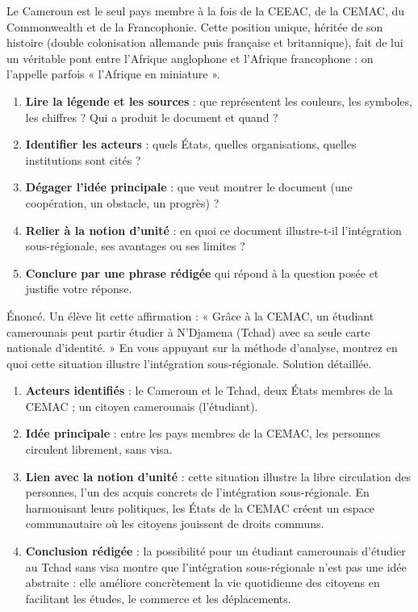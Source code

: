 \documentclass[11pt]{article}
\newcommand{\cle}[1]{{\popxbold\color{popdark}#1}}
\newcounter{popsec}
\newcounter{popsub}
\newcommand{\courssub}[1]{%
  \stepcounter{popsub}%
  \par\vspace{9pt}\noindent{\popxbold\fontsize{11.5}{13}\selectfont\color{popink}{\color{poporange}\thepopsec.\thepopsub}\hspace{6pt}#1}\par\nopagebreak\vspace{4pt}
}
\begin{document}
\begin{savaistu}
Le Cameroun est le seul pays membre à la fois de la CEEAC, de la CEMAC, du Commonwealth et de la Francophonie. Cette position unique, héritée de son histoire (double colonisation allemande puis française et britannique), fait de lui un véritable pont entre l'Afrique anglophone et l'Afrique francophone : on l'appelle parfois « l'Afrique en miniature ».
\end{savaistu}

\courssub{Méthode : analyser un document en ECM}

\begin{methode}
\begin{enumerate}
\item \textbf{Lire la légende et les sources} : que représentent les couleurs, les symboles, les chiffres ? Qui a produit le document et quand ?
\item \textbf{Identifier les acteurs} : quels États, quelles organisations, quelles institutions sont cités ?
\item \textbf{Dégager l'idée principale} : que veut montrer le document (une coopération, un obstacle, un progrès) ?
\item \textbf{Relier à la notion d'unité} : en quoi ce document illustre-t-il l'intégration sous-régionale, ses avantages ou ses limites ?
\item \textbf{Conclure par une phrase rédigée} qui répond à la question posée et justifie votre réponse.
\end{enumerate}
\end{methode}

\begin{exoresolu}
Énoncé. Un élève lit cette affirmation : « Grâce à la CEMAC, un étudiant camerounais peut partir étudier à N'Djamena (Tchad) avec sa seule carte nationale d'identité. » En vous appuyant sur la méthode d'analyse, montrez en quoi cette situation illustre l'intégration sous-régionale.
\tcblower
Solution détaillée.
\begin{enumerate}
\item \textbf{Acteurs identifiés} : le Cameroun et le Tchad, deux États membres de la CEMAC ; un citoyen camerounais (l'étudiant).
\item \textbf{Idée principale} : entre les pays membres de la CEMAC, les personnes circulent librement, sans visa.
\item \textbf{Lien avec la notion d'unité} : cette situation illustre la \cle{libre circulation} des personnes, l'un des acquis concrets de l'intégration sous-régionale. En harmonisant leurs politiques, les États de la CEMAC créent un \cle{espace communautaire} où les citoyens jouissent de droits communs.
\item \textbf{Conclusion rédigée} : la possibilité pour un étudiant camerounais d'étudier au Tchad sans visa montre que l'intégration sous-régionale n'est pas une idée abstraite : elle améliore concrètement la vie quotidienne des citoyens en facilitant les études, le commerce et les déplacements.
\end{enumerate}
\end{exoresolu}
\end{document}
